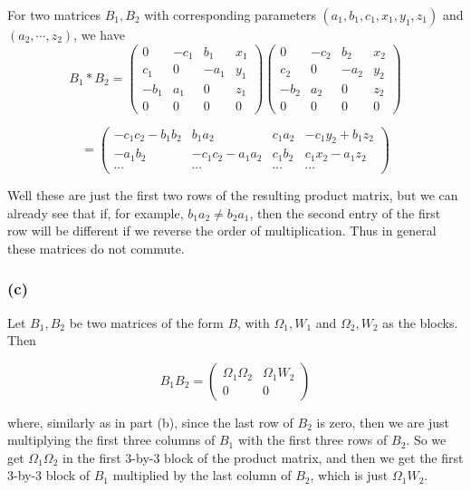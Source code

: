 \documentclass{article}
\begin{document}
For two matrices $B_1, B_2$ with corresponding parameters $(a_1,b_1,c_1,x_1,y_1,z_1)$ and $(a_2,\cdots ,z_2)$, we have
\[ B_1 * B_2 = \left( \begin{array}{cccc} 0 & -c_1 & b_1 & x_1 \\ c_1 & 0 & -a_1 & y_1 \\ -b_1 & a_1 & 0 & z_1 \\ 0 & 0 & 0 & 0 \end{array}\right) \left( \begin{array}{cccc} 0 & -c_2 & b_2 & x_2 \\ c_2 & 0 & -a_2 & y_2 \\ -b_2 & a_2 & 0 & z_2 \\ 0 & 0 & 0 & 0 \end{array}\right)\]

\[ = \left( \begin{array}{cccc} -c_1 c_2 - b_1 b_2 & b_1 a_2 & c_1 a_2 & -c_1 y_2 + b_1 z_2 \\ -a_1 b_2 & -c_1 c_2 - a_1 a_2 & c_1 b_2 & c_1 x_2 - a_1 z_2 \\ \cdots & \cdots & \cdots & \cdots \end{array}\right)\]

Well these are just the first two rows of the resulting product matrix, but we can already see that if, for example, $b_1 a_2 \neq b_2 a_1$, then the second entry of the first row will be different if we reverse the order of multiplication. Thus in general these matrices do not commute. 

\subsubsection{(c)} 

Let $B_1, B_2$ be two matrices of the form $B$, with $\Omega_1,W_1$ and $\Omega_2,W_2$ as the blocks. Then

\[ B_1 B_2 = \left(\begin{array}{cc} \Omega_1 \Omega_2 & \Omega_1 W_2 \\ 0 & 0 \end{array}\right) \]

where, similarly as in part (b), since the last row of $B_2$ is zero, then we are just multiplying the first three columns of $B_1$ with the first three rows of $B_2$. So we get $\Omega_1 \Omega_2$ in the first 3-by-3 block of the product matrix, and then we get the first 3-by-3 block of $B_1$ multiplied by the last column of $B_2$, which is just $\Omega_1 W_2$.
\end{document}
